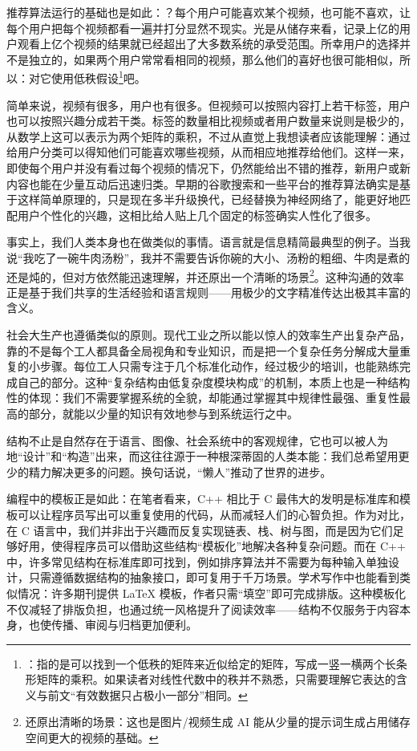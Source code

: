 推荐算法运行的基础也是如此：？每个用户可能喜欢某个视频，也可能不喜欢，让每个用户把每个视频都看一遍并打分显然不现实。光是从储存来看，记录上亿的用户观看上亿个视频的结果就已经超出了大多数系统的承受范围。所幸用户的选择并不是独立的，如果两个用户常常看相同的视频，那么他们的喜好也很可能相似，所以：对它使用低秩假设\footnote{：指的是可以找到一个低秩的矩阵来近似给定的矩阵，写成一竖一横两个长条形矩阵的乘积。如果读者对线性代数中的秩并不熟悉，只需要理解它表达的含义与前文“有效数据只占极小一部分”相同。}吧。

简单来说，视频有很多，用户也有很多。但视频可以按照内容打上若干标签，用户也可以按照兴趣分成若干类。标签的数量相比视频或者用户数量来说则是极少的，从数学上这可以表示为两个矩阵的乘积，不过从直觉上我想读者应该能理解：通过给用户分类可以得知他们可能喜欢哪些视频，从而相应地推荐给他们。这样一来，即使每个用户并没有看过每个视频的情况下，仍然能给出不错的推荐，新用户或新内容也能在少量互动后迅速归类。早期的谷歌搜索和一些平台的推荐算法确实是基于这样简单原理的，只是现在多半升级换代，已经替换为神经网络了，能更好地匹配用户个性化的兴趣，这相比给人贴上几个固定的标签确实人性化了很多。

事实上，我们人类本身也在做类似的事情。语言就是信息精简最典型的例子。当我说“我吃了一碗牛肉汤粉”，我并不需要告诉你碗的大小、汤粉的粗细、牛肉是煮的还是炖的，但对方依然能迅速理解，并还原出一个清晰的场景\footnote{还原出清晰的场景：这也是图片/视频生成 AI 能从少量的提示词生成占用储存空间更大的视频的基础。}。这种沟通的效率正是基于我们共享的生活经验和语言规则——用极少的文字精准传达出极其丰富的含义。

社会大生产也遵循类似的原则。现代工业之所以能以惊人的效率生产出复杂产品，靠的不是每个工人都具备全局视角和专业知识，而是把一个复杂任务分解成大量重复的小步骤。每位工人只需专注于几个标准化动作，经过极少的培训，也能熟练完成自己的部分。这种“复杂结构由低复杂度模块构成”的机制，本质上也是一种结构性的体现：我们不需要掌握系统的全貌，却能通过掌握其中规律性最强、重复性最高的部分，就能以少量的知识有效地参与到系统运行之中。

结构不止是自然存在于语言、图像、社会系统中的客观规律，它也可以被人为地“设计”和“构造”出来，而这往往源于一种根深蒂固的人类本能：我们总希望用更少的精力解决更多的问题。换句话说，“懒人”推动了世界的进步。

编程中的模板正是如此：在笔者看来，C++ 相比于 C 最伟大的发明是标准库和模板可以让程序员写出可以重复使用的代码，从而减轻人们的心智负担。作为对比，在 C 语言中，我们并非出于兴趣而反复实现链表、栈、树与图，而是因为它们足够好用，使得程序员可以借助这些结构“模板化”地解决各种复杂问题。而在 C++ 中，许多常见结构在标准库即可找到，例如排序算法并不需要为每种输入单独设计，只需遵循数据结构的抽象接口，即可复用于千万场景。学术写作中也能看到类似情况：许多期刊提供 LaTeX 模板，作者只需“填空”即可完成排版。这种模板化不仅减轻了排版负担，也通过统一风格提升了阅读效率——结构不仅服务于内容本身，也使传播、审阅与归档更加便利。

